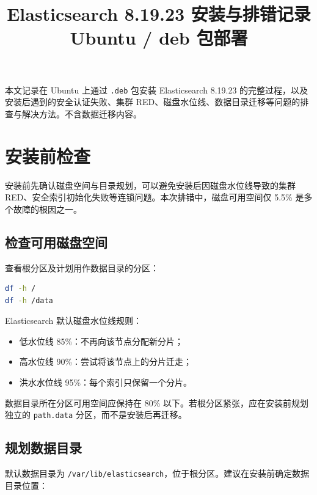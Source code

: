 \documentclass[11pt,a4paper,openany]{ctexbook}
\title{Elasticsearch 8.19.23 安装与排错记录\\\large Ubuntu / deb 包部署}
\author{}
\date{}
\begin{document}
\frontmatter
\maketitle

\begin{note}
本文记录在 Ubuntu 上通过 \texttt{.deb} 包安装 Elasticsearch 8.19.23 的完整过程，以及安装后遇到的安全认证失败、集群 RED、磁盘水位线、数据目录迁移等问题的排查与解决方法。不含数据迁移内容。
\end{note}

\tableofcontents
\mainmatter

\chapter{安装前检查}

安装前先确认磁盘空间与目录规划，可以避免安装后因磁盘水位线导致的集群 RED、安全索引初始化失败等连锁问题。本次排错中，磁盘可用空间仅 5.5\% 是多个故障的根因之一。

\section{检查可用磁盘空间}

查看根分区及计划用作数据目录的分区：

\begin{lstlisting}[language=bash]
df -h /
df -h /data
\end{lstlisting}

Elasticsearch 默认磁盘水位线规则：
\begin{itemize}[leftmargin=1.4em]
  \item 低水位线 85\%：不再向该节点分配新分片；
  \item 高水位线 90\%：尝试将该节点上的分片迁走；
  \item 洪水水位线 95\%：每个索引只保留一个分片。
\end{itemize}

\begin{warn}
数据目录所在分区可用空间应保持在 80\% 以下。若根分区紧张，应在安装前规划独立的 \texttt{path.data} 分区，而不是安装后再迁移。
\end{warn}

\section{规划数据目录}

默认数据目录为 \texttt{/var/lib/elasticsearch}，位于根分区。建议在安装前确定数据目录位置：
\end{document}
